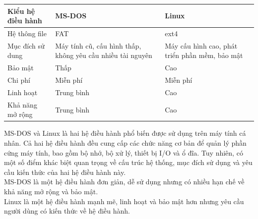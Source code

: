 \documentclass[12pt,a4paper]{article}
\begin{document}
\begin{tabular}{|p{5cm}|p{5.5cm}|p{5.5cm}|}
	\hline 
	Kiểu hệ điều hành &  MS-DOS &  Linux \\
	\hline 
	Hệ thông file & FAT & ext4 \\
	\hline 
	Mục đích sử dung & Máy tính cũ, cấu hình thấp, không yêu cầu nhiều tài nguyên & Máy cấu hình cao, phát triển phần mềm, bảo mật \\
	\hline 
	Bảo mật  & Thấp  & Cao \\
	\hline 
	Chi phí & Miễn phí & Miễn phí \\
	\hline 
	Linh hoạt & Trung bình & Cao \\
	\hline 
	Khả năng mở rộng & Trung bình & Cao \\
	\hline 
\end{tabular}


MS-DOS và Linux là hai hệ điều hành phổ biến được sử dụng trên máy tính cá nhân. Cả hai hệ điều hành đều cung cấp các chức năng cơ bản để quản lý phần cứng máy tính, bao gồm bộ nhớ, bộ xử lý, thiết bị I/O và ổ đĩa. Tuy nhiên, có một số điểm khác biệt quan trọng về cấu trúc hệ thống, mục đích sử dụng và yêu cầu kiến thức của hai hệ điều hành này.\\

MS-DOS là một hệ điều hành đơn giản, dễ sử dụng nhưng có nhiều hạn chế về khả năng mở rộng và bảo mật.\\

Linux là một hệ điều hành mạnh mẽ, linh hoạt và bảo mật hơn nhưng yêu cầu người dùng có kiến thức về hệ điều hành.


	
	
	
\end{document}
